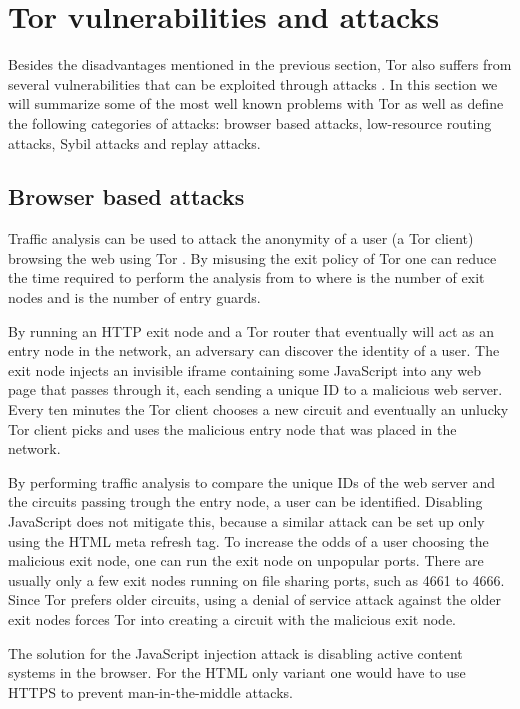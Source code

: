 \documentclass[12pt,journal,compsoc]{IEEEtran}
\begin{document}
\section{Tor vulnerabilities and attacks}
	\label{sec:attacks}
	
	Besides the disadvantages mentioned in the previous section, Tor also suffers from several vulnerabilities that can be exploited through attacks \cite{abbott2007browser, douceur2002sybil, bauer2007low}. In this section we will summarize some of the most well known problems with Tor as well as define the following categories of attacks: browser based attacks, low-resource routing attacks, Sybil attacks and replay attacks.

	\subsection{Browser based attacks}
		Traffic analysis can be used to attack the anonymity of a user (a Tor client) browsing the web using Tor \cite{abbott2007browser}. By misusing the exit policy of Tor one can reduce the time required to perform the analysis from  to  where  is the number of exit nodes and  is the number of entry guards.

		By running an HTTP exit node and a Tor router that eventually will act as an entry node in the network, an adversary can discover the identity of a user. The exit node injects an invisible iframe containing some JavaScript into any web page that passes through it, each sending a unique ID to a malicious web server. Every ten minutes the Tor client chooses a new circuit and eventually an unlucky Tor client picks and uses the malicious entry node that was placed in the network.

		By performing traffic analysis to compare the unique IDs of the web server and the circuits passing trough the entry node, a user can be identified. Disabling JavaScript does not mitigate this, because a similar attack can be set up only using the HTML meta refresh tag. To increase the odds of a user choosing the malicious exit node, one can run the exit node on unpopular ports. There are usually only a few exit nodes running on file sharing ports, such as 4661 to 4666. Since Tor prefers older circuits, using a denial of service attack against the older exit nodes forces Tor into creating a circuit with the malicious exit node.

		The solution for the JavaScript injection attack is disabling active content systems in the browser. For the HTML only variant one would have to use HTTPS to prevent man-in-the-middle attacks.
		
\end{document}
